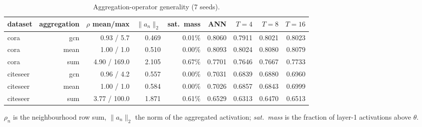 \begin{table}[t]
\centering
\small
\caption{Aggregation-operator generality (7 seeds).}
\label{tab:arch}
\begin{tabular}{lrrrrrrrr}
\toprule
dataset & aggregation & $\rho$ mean/max & $\|a_n\|_2$ & sat.\ mass & ANN & $T=4$ & $T=8$ & $T=16$ \\
\midrule
cora & gcn & 0.93 / 5.7 & 0.469 & 0.01\% & 0.8060 & 0.7911 & 0.8021 & 0.8023 \\
cora & mean & 1.00 / 1.0 & 0.510 & 0.00\% & 0.8093 & 0.8024 & 0.8080 & 0.8079 \\
cora & sum & 4.90 / 169.0 & 2.105 & 0.67\% & 0.7701 & 0.7646 & 0.7667 & 0.7733 \\
citeseer & gcn & 0.96 / 4.2 & 0.557 & 0.00\% & 0.7031 & 0.6839 & 0.6880 & 0.6960 \\
citeseer & mean & 1.00 / 1.0 & 0.584 & 0.00\% & 0.7026 & 0.6857 & 0.6843 & 0.6999 \\
citeseer & sum & 3.77 / 100.0 & 1.871 & 0.61\% & 0.6529 & 0.6313 & 0.6470 & 0.6513 \\
\bottomrule
\end{tabular}
\par\vspace{2pt}\footnotesize $\rho_n$ is the neighbourhood row sum, $\|a_n\|_2$ the norm of the aggregated activation; \emph{sat.\ mass} is the fraction of layer-1 activations above $\theta$.
\end{table}
